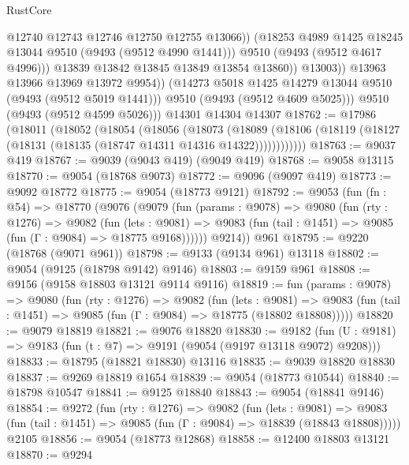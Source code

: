 \begin{lexlean}{RustCore}
\begin{coremodule}
                          @12740
                          @12743
                          @12746
                          @12750
                          @12755
                          @13066))
                      (@18253 @4989 @1425 @18245 @13044 @9510 (@9493 (@9512 @4990 @1441)))
                      @9510
                      (@9493 (@9512 @4617 @4996)))
                    @13839
                    @13842
                    @13845
                    @13849
                    @13854
                    @13860))
                @13003))
            @13963
            @13966
            @13969
            @13972
            @9954))
        (@14273 @5018 @1425 @14279 @13044 @9510 (@9493 (@9512 @5019 @1441)))
        @9510
        (@9493 (@9512 @4609 @5025)))
      @9510
      (@9493 (@9512 @4599 @5026)))
    @14301
    @14304
    @14307
@18762 := @17986
    (@18011
      (@18052
        (@18054
          (@18056
            (@18073
              (@18089
                (@18106 (@18119 (@18127 (@18131 (@18135 (@18747 @14311 @14316 @14322))))))))))))
@18763 := @9037 @419
@18767 := @9039 (@9043 @419) (@9049 @419)
@18768 := @9058 @13115
@18770 := @9054 (@18768 @9073)
@18772 := @9096 (@9097 @419)
@18773 := @9092 @18772
@18775 := @9054 (@18773 @9121)
@18792 := @9053
    (fun (fn : @54) =>
    @18770
      (@9076
        (@9079
          (fun (params : @9078) =>
          @9080
            (fun (rty : @1276) =>
            @9082
              (fun (lets : @9081) =>
              @9083 (fun (tail : @1451) => @9085 (fun (Γ : @9084) => @18775 @9168))))))
        @9214))
    @961
@18795 := @9220 (@18768 (@9071 @961))
@18798 := @9133 (@9134 @961) @13118
@18802 := @9054 (@9125 (@18798 @9142) @9146)
@18803 := @9159 @961
@18808 := @9156 (@9158 @18803 @13121 @9114 @9116)
@18819 := fun (params : @9078) =>
  @9080
    (fun (rty : @1276) =>
    @9082
      (fun (lets : @9081) =>
      @9083 (fun (tail : @1451) => @9085 (fun (Γ : @9084) => @18775 (@18802 @18808)))))
@18820 := @9079 @18819
@18821 := @9076 @18820
@18830 := @9182
    (fun (U : @9181) => @9183 (fun (t : @7) => @9191 (@9054 (@9197 @13118 @9072) @9208)))
@18833 := @18795 (@18821 @18830) @13116
@18835 := @9039 @18820 @18830
@18837 := @9269 @18819 @1654
@18839 := @9054 (@18773 @10544)
@18840 := @18798 @10547
@18841 := @9125 @18840
@18843 := @9054 (@18841 @9146)
@18854 := @9272
    (fun (rty : @1276) =>
    @9082
      (fun (lets : @9081) =>
      @9083 (fun (tail : @1451) => @9085 (fun (Γ : @9084) => @18839 (@18843 @18808)))))
    @2105
@18856 := @9054 (@18773 @12868)
@18858 := @12400 @18803 @13121
@18870 := @9294

\end{coremodule}
\end{lexlean}
